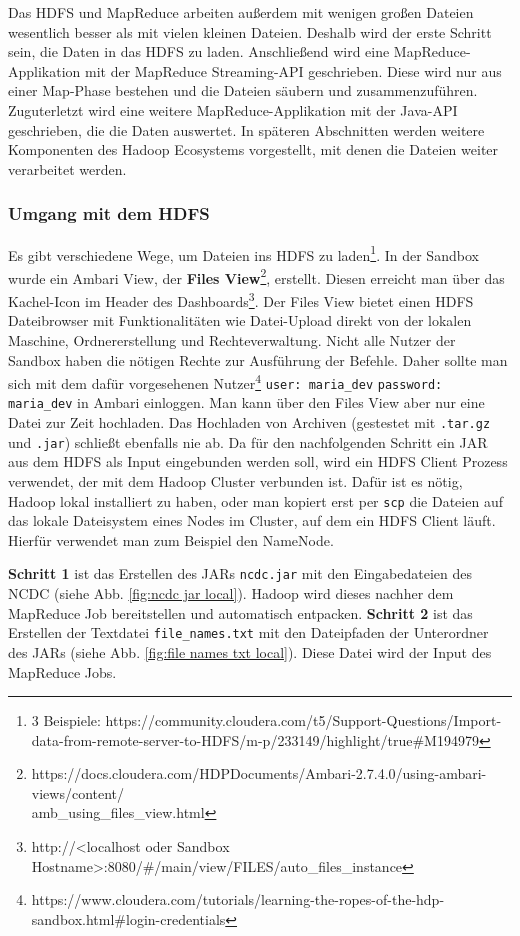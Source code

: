 Das HDFS und MapReduce arbeiten außerdem mit wenigen großen Dateien wesentlich besser als mit vielen kleinen Dateien.\cite[\textit{(S. 19-30, 693-695)}]{white_hadoop_2015} Deshalb wird der erste Schritt sein, die Daten in das HDFS zu laden. Anschließend wird eine MapReduce-Applikation mit der MapReduce Streaming-API geschrieben. Diese wird nur aus einer Map-Phase bestehen und die Dateien säubern und zusammenzuführen. Zuguterletzt wird eine weitere MapReduce-Applikation mit der Java-API geschrieben, die die Daten auswertet. In späteren Abschnitten werden weitere Komponenten des Hadoop Ecosystems vorgestellt, mit denen die Dateien weiter verarbeitet werden.
\subsubsection*{Umgang mit dem HDFS}
\label{chap:fund sec:core sub:handson hdfs}
Es gibt verschiedene Wege, um Dateien ins HDFS zu laden\footnote{3 Beispiele: https://community.cloudera.com/t5/Support-Questions/Import-data-from-remote-server-to-HDFS/m-p/233149/highlight/true\#M194979}. In der Sandbox wurde ein Ambari View, der \textbf{Files View}\footnote{https://docs.cloudera.com/HDPDocuments/Ambari-2.7.4.0/using-ambari-views/content/\\amb\_using\_files\_view.html}, erstellt. Diesen erreicht man über das Kachel-Icon im Header des Dashboards\footnote{http://<localhost oder Sandbox Hostname>:8080/\#/main/view/FILES/auto\_files\_instance}. Der Files View bietet einen HDFS Dateibrowser mit Funktionalitäten wie Datei-Upload direkt von der lokalen Maschine, Ordnererstellung und Rechteverwaltung. Nicht alle Nutzer der Sandbox haben die nötigen Rechte zur Ausführung der Befehle. Daher sollte man sich mit dem dafür vorgesehenen Nutzer\footnote{https://www.cloudera.com/tutorials/learning-the-ropes-of-the-hdp-sandbox.html\#login-credentials} \verb|user: maria_dev| \verb|password: maria_dev| in Ambari einloggen. Man kann über den Files View aber nur eine Datei zur Zeit hochladen. Das Hochladen von Archiven (gestestet mit \verb|.tar.gz| und \verb|.jar|) schließt ebenfalls nie ab. Da für den nachfolgenden Schritt ein JAR aus dem HDFS als Input eingebunden werden soll, wird ein HDFS Client Prozess verwendet, der mit dem Hadoop Cluster verbunden ist. Dafür ist es nötig, Hadoop lokal installiert zu haben, oder man kopiert erst per \verb|scp| die Dateien auf das lokale Dateisystem eines Nodes im Cluster, auf dem ein HDFS Client läuft. Hierfür verwendet man zum Beispiel den NameNode. 
\par
\textbf{Schritt 1} ist das Erstellen des JARs \verb|ncdc.jar| mit den Eingabedateien des NCDC (siehe Abb. \ref{fig:ncdc jar local}). Hadoop wird dieses nachher dem MapReduce Job bereitstellen und automatisch entpacken. \textbf{Schritt 2} ist das Erstellen der Textdatei \verb|file_names.txt| mit den Dateipfaden der Unterordner des JARs (siehe Abb. \ref{fig:file names txt local}). Diese Datei wird der Input des MapReduce Jobs. 


